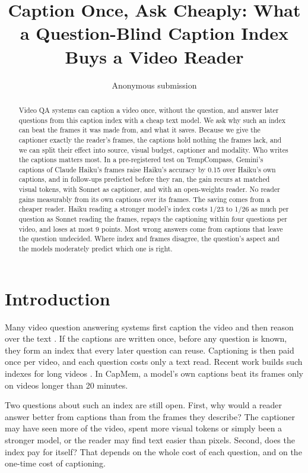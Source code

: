 \documentclass[11pt]{article}
\title{Caption Once, Ask Cheaply: What a Question-Blind Caption Index\\Buys a Video Reader}
\author{Anonymous submission}
\begin{document}
\maketitle

\begin{abstract}
Video QA systems can caption a video once, without the question, and answer later questions from this caption index with a cheap text model. We ask why such an index can beat the frames it was made from, and what it saves. Because we give the captioner exactly the reader's frames, the captions hold nothing the frames lack, and we can split their effect into source, visual budget, captioner and modality. Who writes the captions matters most. In a pre-registered test on TempCompass, Gemini's captions of Claude Haiku's frames raise Haiku's accuracy by 0.15 over Haiku's own captions, and in follow-ups predicted before they ran, the gain recurs at matched visual tokens, with Sonnet as captioner, and with an open-weights reader. No reader gains measurably from its own captions over its frames. The saving comes from a cheaper reader. Haiku reading a stronger model's index costs 1/23 to 1/26 as much per question as Sonnet reading the frames, repays the captioning within four questions per video, and loses at most 9 points. Most wrong answers come from captions that leave the question undecided. Where index and frames disagree, the question's aspect and the models moderately predict which one is right.
\end{abstract}

\section{Introduction}

Many video question answering systems first caption the video and then reason over the text \citep{llovi,videotree,silvr}. If the captions are written once, before any question is known, they form an index that every later question can reuse. Captioning is then paid once per video, and each question costs only a text read. Recent work builds such indexes for long videos \citep{cfd,capmem,sprout}. In CapMem, a model's own captions beat its frames only on videos longer than 20 minutes.

Two questions about such an index are still open. First, why would a reader answer better from captions than from the frames they describe? The captioner may have seen more of the video, spent more visual tokens or simply been a stronger model, or the reader may find text easier than pixels. Second, does the index pay for itself? That depends on the whole cost of each question, and on the one-time cost of captioning.
\end{document}
